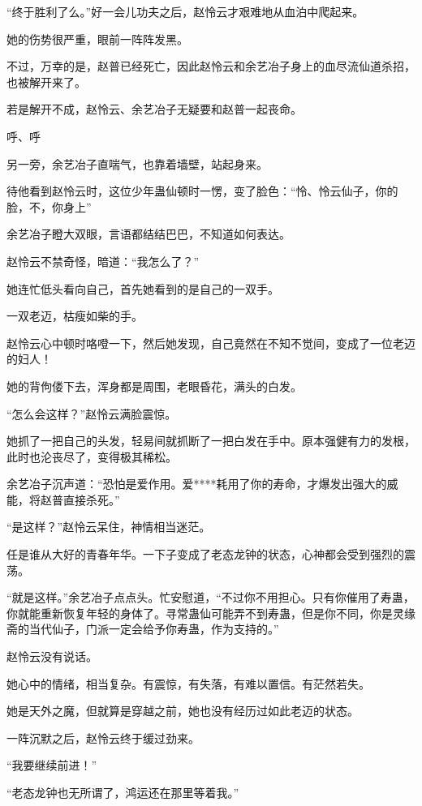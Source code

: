 
\begin{this_body}

“终于胜利了么。”好一会儿功夫之后，赵怜云才艰难地从血泊中爬起来。

她的伤势很严重，眼前一阵阵发黑。

不过，万幸的是，赵普已经死亡，因此赵怜云和余艺冶子身上的血尽流仙道杀招，也被解开来了。

若是解开不成，赵怜云、余艺冶子无疑要和赵普一起丧命。

呼、呼

另一旁，余艺冶子直喘气，也靠着墙壁，站起身来。

待他看到赵怜云时，这位少年蛊仙顿时一愣，变了脸色：“怜、怜云仙子，你的脸，不，你身上”

余艺冶子瞪大双眼，言语都结结巴巴，不知道如何表达。

赵怜云不禁奇怪，暗道：“我怎么了？”

她连忙低头看向自己，首先她看到的是自己的一双手。

一双老迈，枯瘦如柴的手。

赵怜云心中顿时咯噔一下，然后她发现，自己竟然在不知不觉间，变成了一位老迈的妇人！

她的背佝偻下去，浑身都是周围，老眼昏花，满头的白发。

“怎么会这样？”赵怜云满脸震惊。

她抓了一把自己的头发，轻易间就抓断了一把白发在手中。原本强健有力的发根，此时也沦丧尽了，变得极其稀松。

余艺冶子沉声道：“恐怕是爱作用。爱****耗用了你的寿命，才爆发出强大的威能，将赵普直接杀死。”

“是这样？”赵怜云呆住，神情相当迷茫。

任是谁从大好的青春年华。一下子变成了老态龙钟的状态，心神都会受到强烈的震荡。

“就是这样。”余艺冶子点点头。忙安慰道，“不过你不用担心。只有你催用了寿蛊，你就能重新恢复年轻的身体了。寻常蛊仙可能弄不到寿蛊，但是你不同，你是灵缘斋的当代仙子，门派一定会给予你寿蛊，作为支持的。”

赵怜云没有说话。

她心中的情绪，相当复杂。有震惊，有失落，有难以置信。有茫然若失。

她是天外之魔，但就算是穿越之前，她也没有经历过如此老迈的状态。

一阵沉默之后，赵怜云终于缓过劲来。

“我要继续前进！”

“老态龙钟也无所谓了，鸿运还在那里等着我。”


\end{this_body}
